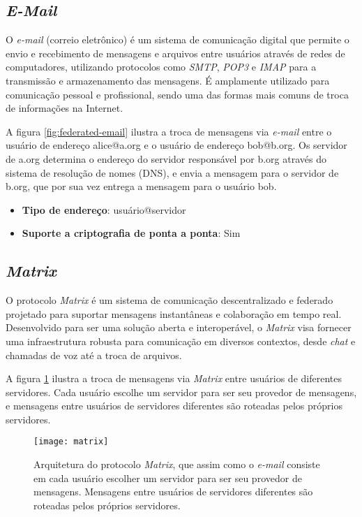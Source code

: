\subsection{\textit{E-Mail}}

O \textit{e-mail} (correio eletrônico) é um sistema de comunicação digital que permite o envio e recebimento de mensagens e arquivos entre usuários através de redes de computadores, utilizando protocolos como \textit{SMTP}, \textit{POP3} e \textit{IMAP} para a transmissão e armazenamento das mensagens. É amplamente utilizado para comunicação pessoal e profissional, sendo uma das formas mais comuns de troca de informações na Internet. \cite{rfc5321}

A figura \ref{fig:federated-email} ilustra a troca de mensagens via \textit{e-mail} entre o usuário de endereço alice@a.org e o usuário de endereço bob@b.org. Os servidor de a.org determina o endereço do servidor responsável por b.org através do sistema de resolução de nomes (DNS), e envia a mensagem para o servidor de b.org, que por sua vez entrega a mensagem para o usuário bob.

\begin{itemize}
  \item \textbf{Tipo de endereço}: usuário@servidor
  \item \textbf{Suporte a criptografia de ponta a ponta}: Sim
\end{itemize}

\subsection{\textit{Matrix}}

O protocolo \textit{Matrix} é um sistema de comunicação descentralizado e federado projetado para suportar mensagens instantâneas e colaboração em tempo real. Desenvolvido para ser uma solução aberta e interoperável, o \textit{Matrix} visa fornecer uma infraestrutura robusta para comunicação em diversos contextos, desde \textit{chat} e chamadas de voz até a troca de arquivos. \cite{matrixspec}

A figura \ref{fig:matrix} ilustra a troca de mensagens via \textit{Matrix} entre usuários de diferentes servidores. Cada usuário escolhe um servidor para ser seu provedor de mensagens, e mensagens entre usuários de servidores diferentes são roteadas pelos próprios servidores.

\begin{figure}
  \centering
  \texttt{[image: matrix]}

  \caption{Arquitetura do protocolo \textit{Matrix}, que assim como o \textit{e-mail} consiste em cada usuário escolher um servidor para ser seu provedor de mensagens. Mensagens entre usuários de servidores diferentes são roteadas pelos próprios servidores. \cite{matrixspec}}
  \label{fig:matrix}
\end{figure}

